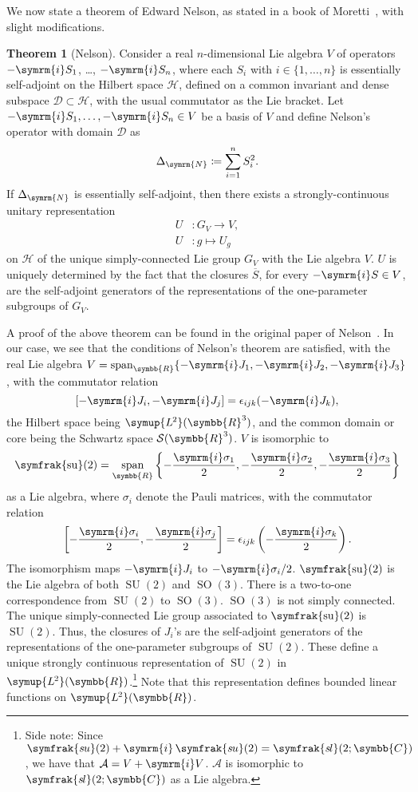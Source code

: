 \documentclass[12pt, a4 paper]{article}
\let\symcal\mathcal
\theoremstyle{definition}
\newtheorem{thm}{Theorem}
\newcommand{\ltwo}{\symup{L\kern-0.5pt^2}}
\newcommand{\ltworthree}{\ltwo(\rr^3)}
\newcommand{\rr}{\symbb{R}}
\newcommand{\cc}{\symbb{C}}
\newcommand{\hilbert}{\symcal{H}}
\newcommand{\ltwor}{\ltwo(\rr)}
\newcommand{\schwartz}{\symcal{S}}
\newcommand{\schwartzrthree}{\schwartz(\rr^3)}
\renewcommand{\i}{\symrm{i}}
\newcommand{\domain}{\symcal{D}}
\DeclareMathOperator{\spann}{span}
\newcommand{\sutwo}{\operatorname{\symfrak{su}}(2)}
\newcommand{\SUtwo}{\operatorname{SU}(2)}
\newcommand{\SOthree}{\operatorname{SO}(3)}
\begin{document}
    We now state a theorem of Edward Nelson, as stated in a book of Moretti~\cite[p.~291]{MorettiFundamental}, with slight modifications.
    \begin{thm}[Nelson]
        Consider a real \(n\)-dimensional Lie algebra \(V\) of operators \(-\i S_1\), \ldots, \(-\i S_n\), where each \(S_i\) with \(i \in \{1, \ldots, n\}\) is essentially self-adjoint on the Hilbert space \(\hilbert\), defined on a common invariant and dense subspace \(\domain \subset \hilbert\), with the usual commutator as the Lie bracket.
        Let \(-\i S_1, \ldots, -\i S_n \in V\) be a basis of \(V\) and define Nelson's operator with domain \(\domain\) as
        \[
            \Delta_{\symrm{N}} \coloneq \sum_{i=1}^{n} S_i^2.
        \]
        If \(\Delta_{\symrm{N}}\) is essentially self-adjoint, then there exists a strongly-continuous unitary representation
        \begin{align*}
            U &\colon G_V \rightarrow V,\\
            U &\colon g \mapsto U_g
        \end{align*}
        on \(\hilbert\) of the unique simply-connected Lie group \(G_V\) with the Lie algebra \(V\).
        \(U\) is uniquely determined by the fact that the closures \(\overline{S}\), for every \(-\i S \in V\), are the self-adjoint generators of the representations of the one-parameter subgroups of \(G_V\).
    \end{thm}
    A proof of the above theorem can be found in the original paper of Nelson~\cite{Nelson}. In our case, we see that the conditions of Nelson's theorem are satisfied, with the real Lie algebra \(V = \spann_{\rr}\{-\i J_1, -\i J_2, -\i J_3\}\), with the commutator relation \[[-\i J_i, -\i J_j] = \epsilon_{ijk}(-\i J_k),\] the Hilbert space being \(\ltworthree\), and the common domain or core  being the Schwartz space \(\schwartzrthree\). \(V\) is isomorphic to \[\displaystyle\sutwo = \spann_{\rr}\left\{-\frac{\i\sigma_1}{2}, -\frac{\i\sigma_2}{2}, -\frac{\i\sigma_3}{2}\right\}\] as a Lie algebra, where \(\sigma_i\) denote the Pauli matrices, with the commutator relation \[\displaystyle\left[-\frac{\i\sigma_i}{2}, -\frac{\i\sigma_j}{2}\right] = \epsilon_{ijk}\left(-\frac{\i\sigma_k}{2}\right).\] The isomorphism maps \(-\i J_i\) to \(-\i \sigma_i/2\). \(\sutwo\) is the Lie algebra of both \(\SUtwo\) and \(\SOthree\). There is a two-to-one correspondence from \(\SUtwo\) to \(\SOthree\). \(\SOthree\) is not simply connected. The unique simply-connected Lie group associated to \(\sutwo\) is \(\SUtwo\). Thus, the closures of \(J_i\)'s are the self-adjoint generators of the representations of the one-parameter subgroups of \(\SUtwo\). These define a unique strongly continuous representation of \(\SUtwo\) in \(\ltwor\).\footnote{Side note: Since \(\symfrak{s\kern-0.6ptu}(2) + \i\,\symfrak{s\kern-0.6ptu}(2) = \symfrak{s\kern-0.8ptl}(2;\cc)\), we have that \(\symcal{A} = V + \i V\). \(\symcal{A}\) is isomorphic to \(\symfrak{s\kern-0.8ptl}(2;\cc)\) as a Lie algebra.} Note that this representation defines bounded linear functions on \(\ltwor\).
\end{document}
